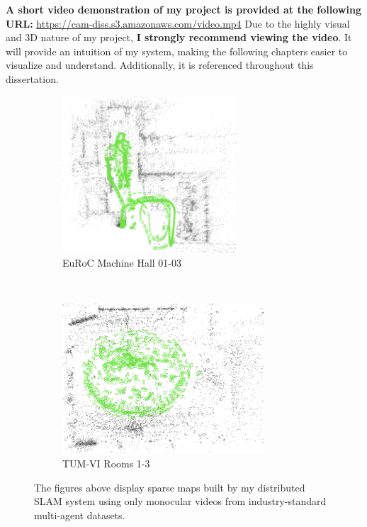 \begin{leftbar}
    \textbf{A short video demonstration of my project is provided at the following URL:} \url{https://cam-diss.s3.amazonaws.com/video.mp4}  \captionbreak Due to the highly visual and 3D nature of my project, \textbf{I strongly recommend viewing the video}. It will provide an intuition of my system, making the following chapters easier to visualize and understand. Additionally, it is referenced throughout this dissertation.
\end{leftbar}

\begin{figure}[h]
    \centering
    \captionsetup{format=plain, labelformat=empty}
    \begin{subfigure}[t]{0.475\linewidth}
        \centering
        \includegraphics[height=2.3in]{figures/euroc_mh_map.png}
        \caption{EuRoC Machine Hall 01-03}
    \end{subfigure}\hfill%
    ~
    \begin{subfigure}[t]{0.475\linewidth}
        \centering
        \includegraphics[height=2.2in]{figures/tum_room_map.png}
        \caption{TUM-VI Rooms 1-3}
    \end{subfigure}

    \caption{The figures above display sparse maps built by my distributed SLAM system using only monocular videos from industry-standard multi-agent datasets.}
    \label{fig:example-maps}
\end{figure}
